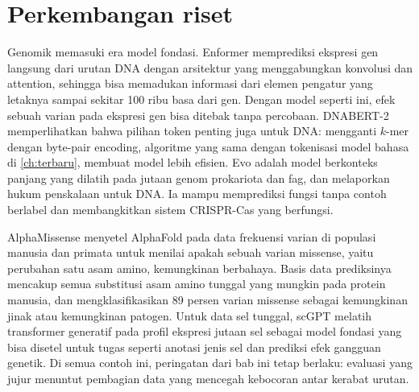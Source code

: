 \section{Perkembangan riset}

Genomik memasuki era model fondasi. Enformer \citep{avsec2021} memprediksi ekspresi gen langsung dari urutan DNA dengan
arsitektur yang menggabungkan konvolusi dan attention, sehingga bisa memadukan informasi dari elemen pengatur yang letaknya
sampai sekitar 100 ribu basa dari gen. Dengan model seperti ini, efek sebuah varian pada ekspresi gen bisa ditebak tanpa
percobaan. DNABERT-2 \citep{zhou2023dnabert2} memperlihatkan bahwa pilihan token penting juga untuk DNA: mengganti $k$-mer
dengan byte-pair encoding, algoritme yang sama dengan tokenisasi model bahasa di \cref{ch:terbaru}, membuat model lebih
efisien. Evo \citep{nguyen2024evo} adalah model berkonteks panjang yang dilatih pada jutaan genom prokariota dan fag, dan
melaporkan hukum penskalaan untuk DNA. Ia mampu memprediksi fungsi tanpa contoh berlabel dan membangkitkan sistem
CRISPR-Cas yang berfungsi.

AlphaMissense \citep{cheng2023} menyetel AlphaFold pada data frekuensi varian di populasi manusia dan primata untuk
menilai apakah sebuah varian missense, yaitu perubahan satu asam amino, kemungkinan berbahaya. Basis data prediksinya
mencakup semua substitusi asam amino tunggal yang mungkin pada protein manusia, dan mengklasifikasikan 89 persen varian
missense sebagai kemungkinan jinak atau kemungkinan patogen. Untuk data sel tunggal, scGPT \citep{cui2024} melatih
transformer generatif pada profil ekspresi jutaan sel sebagai model fondasi yang bisa disetel untuk tugas seperti
anotasi jenis sel dan prediksi efek gangguan genetik. Di semua contoh ini, peringatan dari bab ini tetap berlaku:
evaluasi yang jujur menuntut pembagian data yang mencegah kebocoran antar kerabat urutan.

